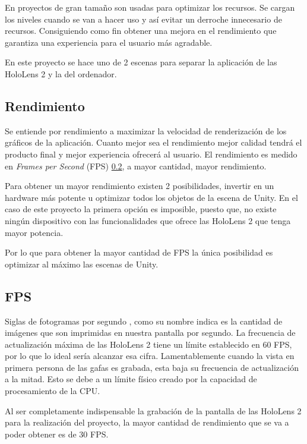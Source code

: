 En proyectos de gran tamaño son usadas para optimizar los recursos. Se cargan los niveles cuando se van a hacer uso y así evitar un derroche innecesario de recursos. Consiguiendo como fin obtener una mejora en el rendimiento que garantiza una experiencia para el usuario más agradable.

En este proyecto se hace uno de 2 escenas para separar la aplicación de las HoloLens 2 y la del ordenador.

\subsection{Rendimiento}

Se entiende por rendimiento a maximizar la velocidad de renderización de los gráficos de la aplicación. Cuanto mejor sea el rendimiento mejor calidad tendrá el producto final y mejor experiencia ofrecerá al usuario. El rendimiento es medido en \textit{Frames per Second} (FPS) \ref{sub:fps}, a mayor cantidad, mayor rendimiento.

Para obtener un mayor rendimiento existen 2 posibilidades, invertir en un hardware más potente u optimizar todos los objetos de la escena de Unity. En el caso de este proyecto la primera opción es imposible, puesto que, no existe ningún dispositivo con las funcionalidades que ofrece las HoloLens 2 que tenga mayor potencia.

Por lo que para obtener la mayor cantidad de FPS la única posibilidad es optimizar al máximo las escenas de Unity.

\subsection{FPS}\label{sub:fps}

Siglas de fotogramas por segundo \cite{wiki:fps}, como su nombre indica es la cantidad de imágenes que son imprimidas en nuestra pantalla por segundo. La frecuencia de actualización máxima de las HoloLens 2 tiene un límite establecido en 60 FPS, por lo que lo ideal sería alcanzar esa cifra. Lamentablemente cuando la vista en primera persona de las gafas es grabada, esta baja su frecuencia de actualización a la mitad. Esto se debe a un límite físico creado por la capacidad de procesamiento de la CPU.

Al ser completamente indispensable la grabación de la pantalla de las HoloLens 2 para la realización del proyecto, la mayor cantidad de rendimiento que se va a poder obtener es de 30 FPS.